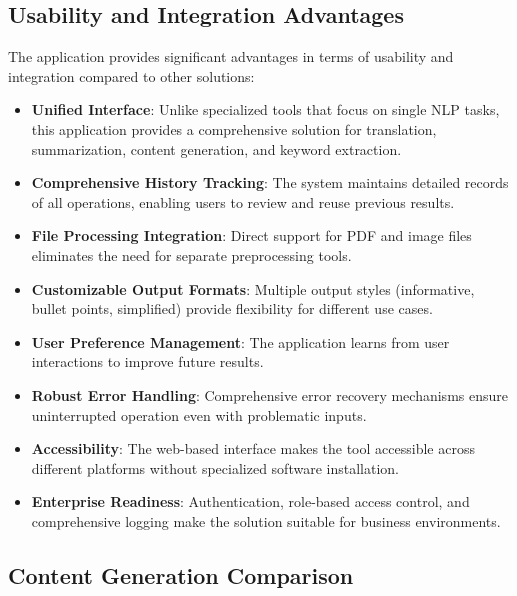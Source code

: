 \documentclass[12pt,a4paper]{article}
\begin{document}
\subsection{Usability and Integration Advantages}

The application provides significant advantages in terms of usability and integration compared to other solutions:

\begin{itemize}
    \item \textbf{Unified Interface}: Unlike specialized tools that focus on single NLP tasks, this application provides a comprehensive solution for translation, summarization, content generation, and keyword extraction.
    
    \item \textbf{Comprehensive History Tracking}: The system maintains detailed records of all operations, enabling users to review and reuse previous results.
    
    \item \textbf{File Processing Integration}: Direct support for PDF and image files eliminates the need for separate preprocessing tools.
    
    \item \textbf{Customizable Output Formats}: Multiple output styles (informative, bullet points, simplified) provide flexibility for different use cases.
    
    \item \textbf{User Preference Management}: The application learns from user interactions to improve future results.
    
    \item \textbf{Robust Error Handling}: Comprehensive error recovery mechanisms ensure uninterrupted operation even with problematic inputs.
    
    \item \textbf{Accessibility}: The web-based interface makes the tool accessible across different platforms without specialized software installation.
    
    \item \textbf{Enterprise Readiness}: Authentication, role-based access control, and comprehensive logging make the solution suitable for business environments.
\end{itemize}

\subsection{Content Generation Comparison}
\end{document}
